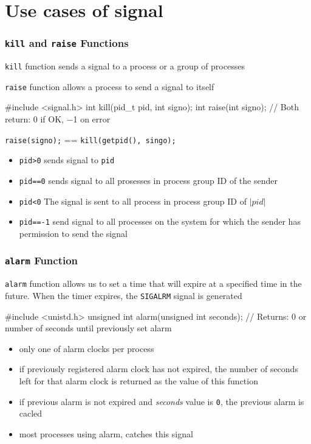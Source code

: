 \documentclass[newPxFont,sthlmFooter,nooffset]{beamer}
\begin{document}
\section{Use cases of signal}



\begin{frame}[fragile,t]
  \frametitle{\texttt{kill} and \texttt{raise} Functions}
\texttt{kill} function sends a signal to a process or a group of processes

\texttt{raise} function allows a process to send a signal to itself

\begin{codedef}
#include <signal.h>
int kill(pid_t pid, int signo);
int raise(int signo);
// Both return: 0 if OK, −1 on error
\end{codedef}

{\hfill \texttt{raise(signo);} == \texttt{kill(getpid(), singo);}\hfill}

\begin{itemize}
\item \texttt{pid>0} sends signal to \texttt{pid}
\item \texttt{pid==0} sends signal to all prosesses in process group ID of the sender
\item \texttt{pid<0} The signal is sent to all process in process group ID of $|pid|$
\item \texttt{pid==-1} send signal to all processes on the system for which the sender has permission to send the signal
\end{itemize}
\end{frame}



\begin{frame}[fragile,t]
  \frametitle{\texttt{alarm} Function}
\texttt{alarm} function allows us to set a time that will expire at a specified time in the future. When the timer expires, the \texttt{SIGALRM} signal is generated
\begin{codedef}
#include <unistd.h>
unsigned int alarm(unsigned int seconds);
// Returns: 0 or number of seconds until previously set alarm
\end{codedef}

\begin{itemize}
\item only one of alarm clocks per process
\item if previously registered alarm clock has not expired, the number of seconds left for that alarm clock is returned as the value of this function
\item if previous alarm is not expired and \textit{seconds} value is \texttt{0}, the previous alarm is cacled
\item most processes using alarm, catches this signal
\end{itemize}
\end{frame}
\end{document}
